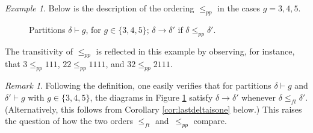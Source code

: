 \documentclass[11pt]{amsart}
\numberwithin{equation}{section}
\theoremstyle{plain}
\newcommand{\<}{\left \langle}
\renewcommand{\>}{\right \rangle}
\theoremstyle{definition}
\theoremstyle{remark}
\newtheorem{rem}[thm]{Remark}
\newtheorem{exmp}[thm]{Example}
\begin{document}
\begin{exmp}
\label{exmp:345}
Below is the description of the ordering $\leq_{pp}$ in the cases $g = 3, 4, 5$.

 \begin{figure}[H]
 \begin{center}
\end{center}
     
     \caption{Partitions $\delta \vdash g$, for $g \in \{3, 4, 5\}$; $\delta \rightarrow \delta'$ if ${\delta} \leq_{pp} {\delta'}$.}
     \label{fig:partitions_genus345}
 \end{figure} 

\noindent The transitivity of  $\leq_{pp}$ is reflected in this example by observing, for instance, that $3 \leq_{pp} 111$, $22 \leq_{pp} 1111$, and $32\leq_{pp} 2111$. 
\end{exmp}

\begin{rem}
Following the definition, one easily verifies that for partitions $\delta \vdash g$ and $\delta' \vdash g$ with $g \in \{3, 4, 5\}$, the diagrams in Figure \ref{fig:partitions_genus345} satisfy
$\delta \rightarrow \delta'$ whenever ${\delta} \leq_{ft} {\delta'}$. (Alternatively, this follows from Corollary \ref{cor:lastdeltaisone} below.)
This raises the question of how the two orders $\leq_{ft}$ and~$\leq_{pp}$ compare.     
\end{rem}
\end{document}
